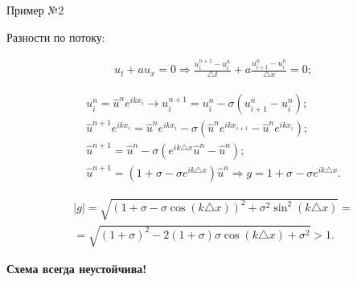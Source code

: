 \documentclass[10pt,xcolor=pst,aspectratio=169]{beamer}
\begin{document}
\begin{frame}{Пример №2}

    \transdissolve[duration=0.1]
    \justifying
    \large

    Разности по потоку:

    \[
        \begin{split}
            &u_{t} + a u_{x} = 0 \Rightarrow \frac{u^{n + 1}_{i} - u^{n}_{i}}{\triangle t} + a \frac{u^{n}_{i + 1} - u^{n}_{i}}{\triangle x} = 0;
        \end{split}
    \]

    \[
        \begin{split}
            &\boxed{u^{n}_{i} = \hat{u}^{n} e^{i k x_{i}}} \rightarrow \boxed{u^{n + 1}_{i} = u^{n}_{i} - \sigma \left( u^{n}_{i + 1} - u^{n}_{i} \right)}; \\
            &\hat{u}^{n + 1} e^{i k x_{i}} = \hat{u}^{n} e^{i k x_{i}} - \sigma \left( \hat{u}^{n} e^{i k x_{i + 1}} - \hat{u}^{n} e^{i k x_{i}} \right); \\
            &\hat{u}^{n + 1} = \hat{u}^{n} - \sigma \left( e^{i k \triangle x} \hat{u}^{n} - \hat{u}^{n} \right); \\
            &\hat{u}^{n + 1} = \left( 1 + \sigma - \sigma e^{i k \triangle x} \right) \hat{u}^{n} \Rightarrow \boxed{g = 1 + \sigma - \sigma e^{i k \triangle x}}.
        \end{split}
    \]

    \[
        \begin{split}
            &|g| = \sqrt{ \left( 1 + \sigma - \sigma \cos{ \left( k \triangle x \right)} \right)^{2} + \sigma^2 \sin^{2}{ \left( k \triangle x \right) } } = \\
            & = \sqrt{ \left( 1 + \sigma \right)^{2} - 2 \left( 1 + \sigma \right) \sigma \cos{ \left( k \triangle x \right)} + \sigma^{2}} > 1.
        \end{split}
    \]

    \begin{center}
        \textbf{Схема всегда неустойчива!}
    \end{center}

\end{frame}
\end{document}
